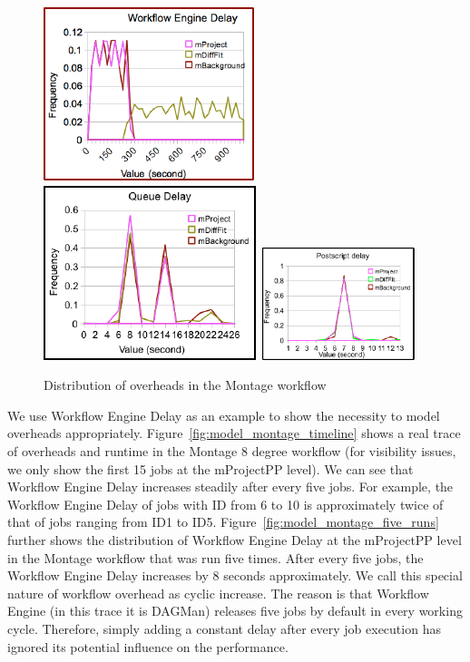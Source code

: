 \begin{figure}[h!]
	\centering
    \includegraphics[height=0.3\textwidth]{figures/model/montage_engine_delay.pdf}
\includegraphics[height=0.3\textwidth]{figures/model/montage_queue_delay.pdf}
\includegraphics[width=0.4\textwidth]{figures/model/montage_post_delay.pdf}

    \caption{Distribution of overheads in the Montage workflow}
    \label{fig:model_montage_distribution}
\end{figure}

We use Workflow Engine Delay as an example to show the necessity to model overheads appropriately. Figure~\ref{fig:model_montage_timeline} shows a real trace of overheads and runtime in the Montage 8 degree workflow (for visibility issues, we only show the first 15 jobs at the mProjectPP level). We can see that Workflow Engine Delay increases steadily after every five jobs. For example, the Workflow Engine Delay of jobs with ID from 6 to 10 is approximately twice of that of jobs ranging from ID1 to ID5. Figure~\ref{fig:model_montage_five_runs} further shows the distribution of Workflow Engine Delay at the mProjectPP level in the Montage workflow that was run five times. After every five jobs, the Workflow Engine Delay increases by 8 seconds approximately. We call this special nature of workflow overhead as cyclic increase. The reason is that Workflow Engine (in this trace it is DAGMan) releases five jobs by default in every working cycle. Therefore, simply adding a constant delay after every job execution has ignored its potential influence on the performance.

